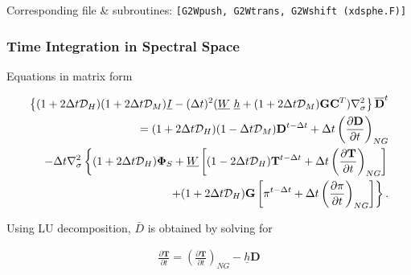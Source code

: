Corresponding file \& subroutines:
\texttt{{[}G2Wpush,\ G2Wtrans,\ G2Wshift\ (xdsphe.F){]}}

\hypertarget{time-integration-in-spectral-space}{%
\subsubsection{Time Integration in Spectral
Space}\label{time-integration-in-spectral-space}}

Equations in matrix form

\begin{eqnarray}
      \left\{ ( 1+2\Delta t {\mathcal D}_H )( 1+2\Delta t {\mathcal D}_M )
           \underline{I}  
      - ( \Delta t )^{2}  ( \underline{W} \ \underline{h}
           + (1+2\Delta t {\mathcal D}_M)
             {\mathbf{G}} {\mathbf{C}}^{T} ) \nabla^{2}_{\sigma}
  \right\}
      \overline{ {\mathbf{D}} }^{t}
       \\
  = ( 1+2\Delta t {\mathcal D}_H )( 1-\Delta t {\mathcal D}_M )
       {\mathbf{D}}^{t-\Delta t}
  +\Delta t
         \left( \frac{\partial {\mathbf{D}}}{\partial t} \right)_{NG}  
  \\
  -\Delta t \nabla^{2}_{\sigma}     
                   \left\{  ( 1+2\Delta t {\mathcal D}_H ) {\mathbf{\Phi}}_{S}
                          + \underline{W}
                            \left[ ( 1-2\Delta t {\mathcal D}_H )
                                    {\mathbf{T}}^{t-\Delta t}
                                  + \Delta t
                                      \left( \frac{\partial {\mathbf{T}}}
                                                  {\partial t}     
                                      \right)_{NG} \right]
                   \right.
  \\
                 \left.  \hspace*{20mm}
                          + ( 1+2\Delta t {\mathcal D}_H ) {\mathbf{G}}
                            \left[ \pi^{t-\Delta t}
                                  + \Delta t
                                     \left( \frac{\partial \pi}
                                                 {\partial t}
                                     \right)_{NG}  \right]
                   \right\} .
\end{eqnarray}

Using LU decomposition, \(\bar{D}\) is obtained by solving for

\begin{eqnarray}
  \frac{\partial {\mathbf{T}}}{\partial t}
      =   \left( \frac{\partial {\mathbf{T}}}
                        {\partial t}       \right)_{NG}  
         - \underline{h} {\mathbf{D}}
\end{eqnarray}

